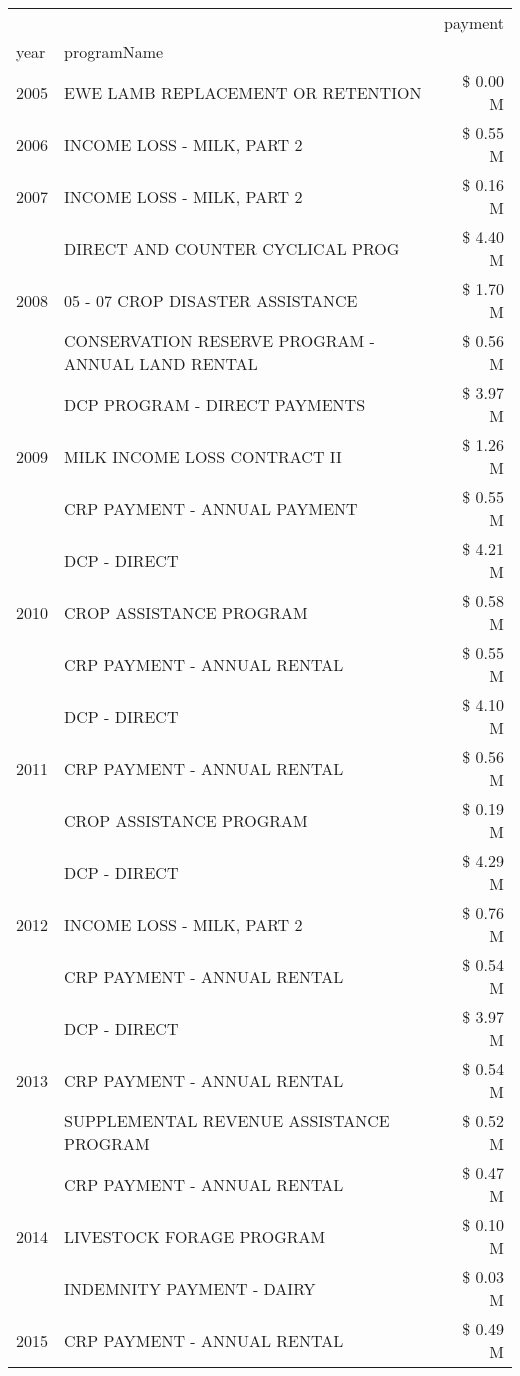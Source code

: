 \begin{tabular}{llr}
\toprule
 &  & payment \\
year & programName &  \\
\midrule
2005 & EWE LAMB REPLACEMENT OR RETENTION & \$ 0.00 M \\
\cline{1-3}
2006 & INCOME LOSS - MILK, PART 2 & \$ 0.55 M \\
\cline{1-3}
2007 & INCOME LOSS - MILK, PART 2 & \$ 0.16 M \\
\cline{1-3}
\multirow[t]{3}{*}{2008} & DIRECT AND COUNTER CYCLICAL PROG & \$ 4.40 M \\
 & 05 - 07 CROP DISASTER ASSISTANCE & \$ 1.70 M \\
 & CONSERVATION RESERVE PROGRAM - ANNUAL LAND RENTAL & \$ 0.56 M \\
\cline{1-3}
\multirow[t]{3}{*}{2009} & DCP PROGRAM - DIRECT PAYMENTS & \$ 3.97 M \\
 & MILK INCOME LOSS CONTRACT II & \$ 1.26 M \\
 & CRP PAYMENT - ANNUAL PAYMENT & \$ 0.55 M \\
\cline{1-3}
\multirow[t]{3}{*}{2010} & DCP - DIRECT & \$ 4.21 M \\
 & CROP ASSISTANCE PROGRAM & \$ 0.58 M \\
 & CRP PAYMENT - ANNUAL RENTAL & \$ 0.55 M \\
\cline{1-3}
\multirow[t]{3}{*}{2011} & DCP - DIRECT & \$ 4.10 M \\
 & CRP PAYMENT - ANNUAL RENTAL & \$ 0.56 M \\
 & CROP ASSISTANCE PROGRAM & \$ 0.19 M \\
\cline{1-3}
\multirow[t]{3}{*}{2012} & DCP - DIRECT & \$ 4.29 M \\
 & INCOME LOSS - MILK, PART 2 & \$ 0.76 M \\
 & CRP PAYMENT - ANNUAL RENTAL & \$ 0.54 M \\
\cline{1-3}
\multirow[t]{3}{*}{2013} & DCP - DIRECT & \$ 3.97 M \\
 & CRP PAYMENT - ANNUAL RENTAL & \$ 0.54 M \\
 & SUPPLEMENTAL REVENUE ASSISTANCE PROGRAM & \$ 0.52 M \\
\cline{1-3}
\multirow[t]{3}{*}{2014} & CRP PAYMENT - ANNUAL RENTAL & \$ 0.47 M \\
 & LIVESTOCK FORAGE PROGRAM & \$ 0.10 M \\
 & INDEMNITY PAYMENT - DAIRY & \$ 0.03 M \\
\cline{1-3}
\multirow[t]{3}{*}{2015} & CRP PAYMENT - ANNUAL RENTAL & \$ 0.49 M \\

\end{tabular}
